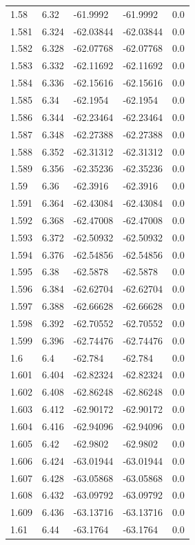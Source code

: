 \begin{tabular}{lllll}
1.58 & 6.32 & -61.9992 & -61.9992 & 0.0 \\
1.581 & 6.324 & -62.03844 & -62.03844 & 0.0 \\
1.582 & 6.328 & -62.07768 & -62.07768 & 0.0 \\
1.583 & 6.332 & -62.11692 & -62.11692 & 0.0 \\
1.584 & 6.336 & -62.15616 & -62.15616 & 0.0 \\
1.585 & 6.34 & -62.1954 & -62.1954 & 0.0 \\
1.586 & 6.344 & -62.23464 & -62.23464 & 0.0 \\
1.587 & 6.348 & -62.27388 & -62.27388 & 0.0 \\
1.588 & 6.352 & -62.31312 & -62.31312 & 0.0 \\
1.589 & 6.356 & -62.35236 & -62.35236 & 0.0 \\
1.59 & 6.36 & -62.3916 & -62.3916 & 0.0 \\
1.591 & 6.364 & -62.43084 & -62.43084 & 0.0 \\
1.592 & 6.368 & -62.47008 & -62.47008 & 0.0 \\
1.593 & 6.372 & -62.50932 & -62.50932 & 0.0 \\
1.594 & 6.376 & -62.54856 & -62.54856 & 0.0 \\
1.595 & 6.38 & -62.5878 & -62.5878 & 0.0 \\
1.596 & 6.384 & -62.62704 & -62.62704 & 0.0 \\
1.597 & 6.388 & -62.66628 & -62.66628 & 0.0 \\
1.598 & 6.392 & -62.70552 & -62.70552 & 0.0 \\
1.599 & 6.396 & -62.74476 & -62.74476 & 0.0 \\
1.6 & 6.4 & -62.784 & -62.784 & 0.0 \\
1.601 & 6.404 & -62.82324 & -62.82324 & 0.0 \\
1.602 & 6.408 & -62.86248 & -62.86248 & 0.0 \\
1.603 & 6.412 & -62.90172 & -62.90172 & 0.0 \\
1.604 & 6.416 & -62.94096 & -62.94096 & 0.0 \\
1.605 & 6.42 & -62.9802 & -62.9802 & 0.0 \\
1.606 & 6.424 & -63.01944 & -63.01944 & 0.0 \\
1.607 & 6.428 & -63.05868 & -63.05868 & 0.0 \\
1.608 & 6.432 & -63.09792 & -63.09792 & 0.0 \\
1.609 & 6.436 & -63.13716 & -63.13716 & 0.0 \\
1.61 & 6.44 & -63.1764 & -63.1764 & 0.0 \\

\end{tabular}
